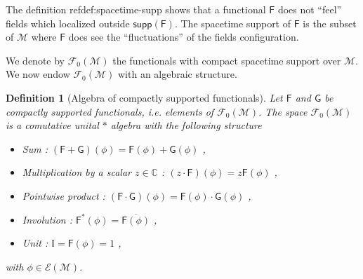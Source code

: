 \documentclass[10pt]{book}
\newcommand{\supp}{\mathsf{supp}}
\newcommand{\Ecal}{\mathcal{E}}
\newcommand{\Fcal}{\mathcal{F}}
\newcommand{\Mcal}{\mathcal{M}}
\newcommand{\Cbb}{\mathbb{C}}
\newcommand{\Ibb}{\mathbb{I}}
\newcommand{\Fsf}{\mathsf{F}}
\newcommand{\Gsf}{\mathsf{G}}
\theoremstyle{break}
\newtheorem{definition}{Definition}
\begin{document}
The definition ref{def:spacetime-supp} shows that a functional $\Fsf$ does not ``feel'' fields which localized outside $\supp(\Fsf)$. The spacetime support of $\Fsf$ is the subset of $\Mcal$ where $\Fsf$ does see the ``fluctuations'' of the fields configuration.




\bigskip


We denote by $\Fcal_0(\Mcal)$ the functionals with compact spacetime support over $\Mcal$. We now endow $\Fcal_0(\Mcal)$ with an algebraic structure. 


\begin{definition}[Algebra of compactly supported functionals] \label{def:algebra-comp.supp.func.}
Let $\Fsf$ and $\Gsf$ be compactly supported functionals, i.e. elements of $\Fcal_0(\Mcal)$. The space $\Fcal_0(\Mcal)$ is a comutative unital $\ast$ algebra with the following structure
%
\begin{itemize}
\item Sum : $(\Fsf+\Gsf)(\phi) = \Fsf(\phi) + \Gsf(\phi)$ ,
\item Multiplication by a scalar $z\in\Cbb$ : $(z \cdot \Fsf)(\phi) = z \Fsf(\phi)$ ,
\item Pointwise product : $(\Fsf \cdot \Gsf)(\phi) = \Fsf(\phi) \cdot \Gsf(\phi)$ ,
\item Involution : $\Fsf^\ast(\phi) = \overline{\Fsf(\phi)}$ ,
\item Unit : $\Ibb = \Fsf(\phi) = 1$ ,
\end{itemize}
%
with $\phi \in \Ecal(\Mcal)$.
\end{definition}
\end{document}

